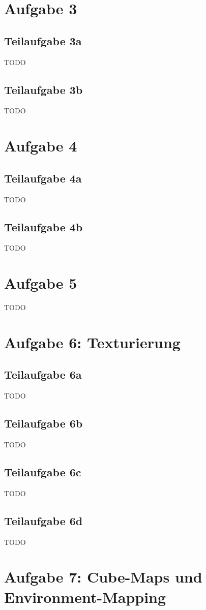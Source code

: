 \documentclass[a4paper]{scrartcl}
\begin{document}
\section*{Aufgabe 3}
\subsection*{Teilaufgabe 3a}
TODO
\subsection*{Teilaufgabe 3b}
TODO

\section*{Aufgabe 4}
\subsection*{Teilaufgabe 4a}
TODO
\subsection*{Teilaufgabe 4b}
TODO

\section*{Aufgabe 5}
TODO

\section*{Aufgabe 6: Texturierung}
\subsection*{Teilaufgabe 6a}
TODO
\subsection*{Teilaufgabe 6b}
TODO
\subsection*{Teilaufgabe 6c}
TODO
\subsection*{Teilaufgabe 6d}
TODO

\section*{Aufgabe 7: Cube-Maps und Environment-Mapping}
\end{document}
